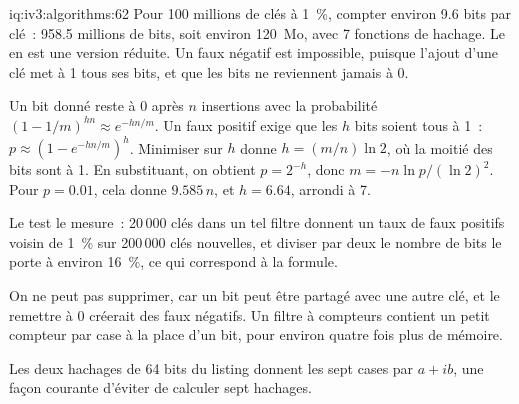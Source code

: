 \begin{solution}{iq:iv3:algorithms:62}
Pour 100 millions de clés à 1~\%, compter environ 9.6 bits par clé~: 958.5 millions de bits, soit environ 120~Mo, avec 7 fonctions de hachage. Le  en est une version réduite. Un faux négatif est impossible, puisque l'ajout d'une clé met à 1 tous ses bits, et que les bits ne reviennent jamais à 0.
\label{lst:iv3:al:bloom}

Un bit donné reste à 0 après $n$ insertions avec la probabilité $(1 - 1/m)^{hn} \approx e^{-hn/m}$. Un faux positif exige que les $h$ bits soient tous à 1~: $p \approx (1 - e^{-hn/m})^h$. Minimiser sur $h$ donne $h = (m/n)\ln 2$, où la moitié des bits sont à 1. En substituant, on obtient $p = 2^{-h}$, donc $m = -n \ln p / (\ln 2)^2$. Pour $p = 0.01$, cela donne $9.585\,n$, et $h = 6.64$, arrondi à 7.

Le test le mesure~: 20\,000 clés dans un tel filtre donnent un taux de faux positifs voisin de 1~\% sur 200\,000 clés nouvelles, et diviser par deux le nombre de bits le porte à environ 16~\%, ce qui correspond à la formule.

On ne peut pas supprimer, car un bit peut être partagé avec une autre clé, et le remettre à 0 créerait des faux négatifs. Un filtre à compteurs contient un petit compteur par case à la place d'un bit, pour environ quatre fois plus de mémoire.

Les deux hachages de 64 bits du listing donnent les sept cases par $a + ib$, une façon courante d'éviter de calculer sept hachages.

\end{solution}

